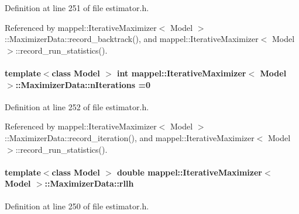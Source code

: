 Definition at line 251 of file estimator.\+h.



Referenced by mappel\+::\+Iterative\+Maximizer$<$ Model $>$\+::\+Maximizer\+Data\+::record\+\_\+backtrack(), and mappel\+::\+Iterative\+Maximizer$<$ Model $>$\+::record\+\_\+run\+\_\+statistics().

\paragraph[{\texorpdfstring{n\+Iterations}{nIterations}}]{\setlength{\rightskip}{0pt plus 5cm}template$<$class Model $>$ int {\bf mappel\+::\+Iterative\+Maximizer}$<$ Model $>$\+::Maximizer\+Data\+::n\+Iterations =0}\hypertarget{classmappel_1_1IterativeMaximizer_1_1MaximizerData_a7ee453c4ba6108b9c0cbce345b0ee4da}{}\label{classmappel_1_1IterativeMaximizer_1_1MaximizerData_a7ee453c4ba6108b9c0cbce345b0ee4da}


Definition at line 252 of file estimator.\+h.



Referenced by mappel\+::\+Iterative\+Maximizer$<$ Model $>$\+::\+Maximizer\+Data\+::record\+\_\+iteration(), and mappel\+::\+Iterative\+Maximizer$<$ Model $>$\+::record\+\_\+run\+\_\+statistics().

\paragraph[{\texorpdfstring{rllh}{rllh}}]{\setlength{\rightskip}{0pt plus 5cm}template$<$class Model $>$ double {\bf mappel\+::\+Iterative\+Maximizer}$<$ Model $>$\+::Maximizer\+Data\+::rllh}\hypertarget{classmappel_1_1IterativeMaximizer_1_1MaximizerData_a224b29201511a2ab8ca86535631c41ef}{}\label{classmappel_1_1IterativeMaximizer_1_1MaximizerData_a224b29201511a2ab8ca86535631c41ef}


Definition at line 250 of file estimator.\+h.



